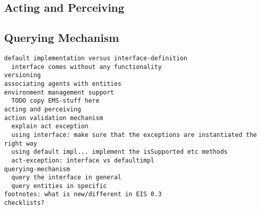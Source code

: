 \documentclass[a4]{article}
\begin{document}
\subsection{Acting and Perceiving}

\subsection{Querying Mechanism}

\begin{verbatim}
default implementation versus interface-definition
  interface comes without any functionality
versioning
associating agents with entities
environment management support
  TODO copy EMS-stuff here
acting and perceiving
action validation mechanism
  explain act exception
  using interface: make sure that the exceptions are instantiated the right way
  using default impl... implement the isSupported etc methods
  act-exception: interface vs defaultimpl
querying-mechanism
  query the interface in general
  query entities in specific
footnotes: what is new/different in EIS 0.3
checklists?
\end{verbatim}
\end{document}
